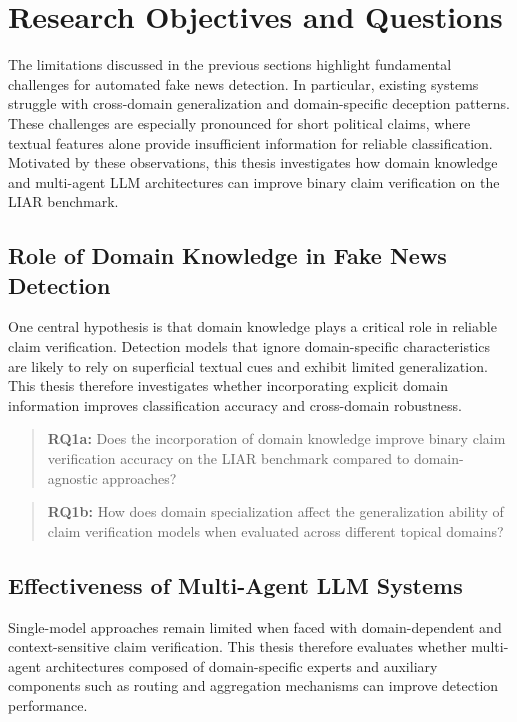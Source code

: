 \section{Research Objectives and Questions}

The limitations discussed in the previous sections highlight fundamental challenges for automated fake news detection. In particular, existing systems struggle with cross-domain generalization and domain-specific deception patterns. These challenges are especially pronounced for short political claims, where textual features alone provide insufficient information for reliable classification. Motivated by these observations, this thesis investigates how domain knowledge and multi-agent LLM architectures can improve binary claim verification on the LIAR benchmark.

\subsection{Role of Domain Knowledge in Fake News Detection}

One central hypothesis is that domain knowledge plays a critical role in reliable claim verification. Detection models that ignore domain-specific characteristics are likely to rely on superficial textual cues and exhibit limited generalization. This thesis therefore investigates whether incorporating explicit domain information improves classification accuracy and cross-domain robustness.

\begin{quote}
\textbf{RQ1a:} Does the incorporation of domain knowledge improve binary claim verification accuracy on the LIAR benchmark compared to domain-agnostic approaches?
\end{quote}

\begin{quote}
\textbf{RQ1b:} How does domain specialization affect the generalization ability of claim verification models when evaluated across different topical domains?
\end{quote}

\subsection{Effectiveness of Multi-Agent LLM Systems}

Single-model approaches remain limited when faced with domain-dependent and context-sensitive claim verification. This thesis therefore evaluates whether multi-agent architectures composed of domain-specific experts and auxiliary components such as routing and aggregation mechanisms can improve detection performance.

